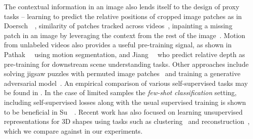 The contextual information in an image also lends itself to the design of proxy 
tasks -- learning to predict the relative positions of cropped image patches as 
in Doersch~\etal~\cite{doersch2015unsupervised}, similarity of patches tracked 
across videos~\cite{wang2015unsupervised,wang2017transitive}, inpainting a 
missing patch in an image by leveraging the context from the rest of the image~\cite{pathak2016context,trinh2019selfie}. Motion from unlabeled videos 
also provides a useful pre-training signal, as shown in Pathak~\etal~\cite{pathak2017learning} using motion segmentation, and
Jiang~\etal~\cite{jiang2018self} who predict relative depth as pre-training 
for downstream scene understanding tasks. 
Other approaches include solving jigsaw puzzles 
with permuted image patches~\cite{noroozi2016unsupervised} and training a 
generative adversarial model~\cite{donahue2019large}. An empirical comparison of 
various self-supervised tasks may be found in \cite{goyal2019scaling,kolesnikov2019revisiting}. 
In the case of limited samples \ie the \textit{few-shot classification} setting,
including self-supervised losses along with the usual supervised training is shown 
to be beneficial in Su~\etal~\cite{su2019does}. 
Recent work has also focused on learning unsupervised representations for 
3D shapes using tasks such as clustering~\cite{hassani2019unsupervised} and 
reconstruction~\cite{sharma2016vconv,yang2018foldingnet}, which we  
compare against in our experiments.

